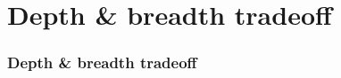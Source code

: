 \section{Depth \& breadth tradeoff}

\begin{frame}
	\frametitle{Depth \& breadth tradeoff}
\end{frame}
